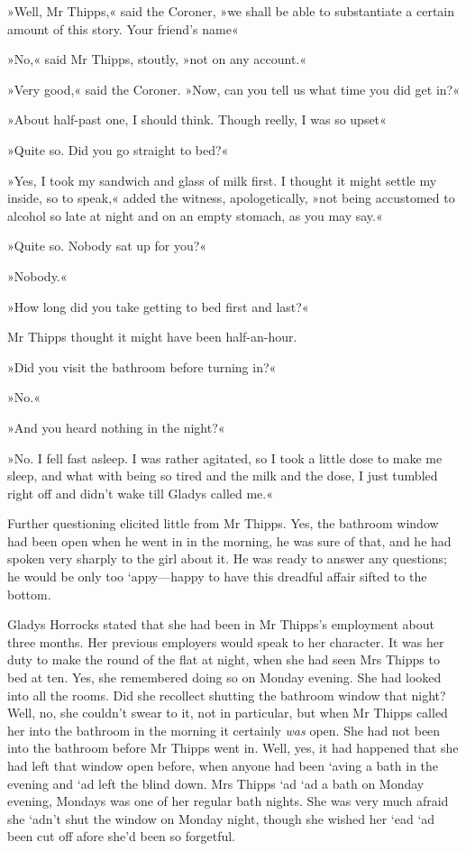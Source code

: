 »Well, Mr Thipps,« said the Coroner, »we shall be able to substantiate a certain amount of this story. Your friend's name\longdash«

»No,« said Mr Thipps, stoutly, »not on any account.«

»Very good,« said the Coroner. »Now, can you tell us what time you did get in?«

»About half-past one, I should think. Though reelly, I was so upset\longdash«

»Quite so. Did you go straight to bed?«

»Yes, I took my sandwich and glass of milk first. I thought it might settle my inside, so to speak,« added the witness, apologetically, »not being accustomed to alcohol so late at night and on an empty stomach, as you may say.«

»Quite so. Nobody sat up for you?«

»Nobody.«

»How long did you take getting to bed first and last?«

Mr Thipps thought it might have been half-an-hour.

»Did you visit the bathroom before turning in?«

»No.«

»And you heard nothing in the night?«

»No. I fell fast asleep. I was rather agitated, so I took a little dose to make me sleep, and what with being so tired and the milk and the dose, I just tumbled right off and didn't wake till Gladys called me.«

Further questioning elicited little from Mr Thipps. Yes, the bathroom window had been open when he went in in the morning, he was sure of that, and he had spoken very sharply to the girl about it. He was ready to answer any questions; he would be only too `appy—happy to have this dreadful affair sifted to the bottom.

Gladys Horrocks stated that she had been in Mr Thipps's employment about three months. Her previous employers would speak to her character. It was her duty to make the round of the flat at night, when she had seen Mrs Thipps to bed at ten. Yes, she remembered doing so on Monday evening. She had looked into all the rooms. Did she recollect shutting the bathroom window that night? Well, no, she couldn't swear to it, not in particular, but when Mr Thipps called her into the bathroom in the morning it certainly \textit{was} open. She had not been into the bathroom before Mr Thipps went in. Well, yes, it had happened that she had left that window open before, when anyone had been `aving a bath in the evening and `ad left the blind down. Mrs Thipps `ad `ad a bath on Monday evening, Mondays was one of her regular bath nights. She was very much afraid she `adn't shut the window on Monday night, though she wished her `ead `ad been cut off afore she'd been so forgetful.

